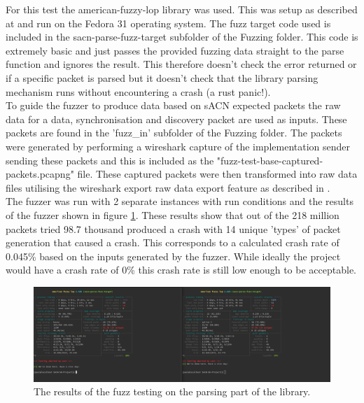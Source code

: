 \documentclass[11pt,a4paper]{article}
\begin{document}
For this test the american-fuzzy-lop library \cite{RUST_AFL_FUZZ} was used. This was setup as described at \cite{RUST_AFL_FUZZ_DOC} and run on the Fedora 31 operating system. The fuzz target code used is included in the sacn-parse-fuzz-target subfolder of the Fuzzing folder. This code is extremely basic and just passes the provided fuzzing data straight to the parse function and ignores the result. This therefore doesn't check the error returned or if a specific packet is parsed but it doesn't check that the library parsing mechanism runs without encountering a crash (a rust panic!).\\

To guide the fuzzer to produce data based on sACN expected packets the raw data for a data, synchronisation and discovery packet are used as inputs. These packets are found in the 'fuzz\_in' subfolder of the Fuzzing folder. The packets were generated by performing a wireshark capture of the implementation sender sending these packets and this is included as the "fuzz-test-base-captured-packets.pcapng" file. These captured packets were then transformed into raw data files utilising the wireshark export raw data export feature as described in \cite{WIRESHARK_EXPORT_RAW}.\\

The fuzzer was run with 2 separate instances with run conditions and the results of the fuzzer shown in figure \ref{FUZZ_RESULTS}. These results show that out of the 218 million packets tried 98.7 thousand produced a crash with 14 unique 'types' of packet generation that caused a crash. This corresponds to a calculated crash rate of 0.045\% based on the inputs generated by the fuzzer. While ideally the project would have a crash rate of 0\% this crash rate is still low enough to be acceptable. 

\begin{figure}[H]
	\begin{turn}{90}
		\begin{minipage}[c][\textwidth][c]{\textheight}
			\centering
			\includegraphics[width=\textwidth]{Fuzzing_Terminal}
			\caption{The results of the fuzz testing on the parsing part of the library.}
			\label{FUZZ_RESULTS}
		\end{minipage}
	\end{turn}
\end{figure}
\end{document}
